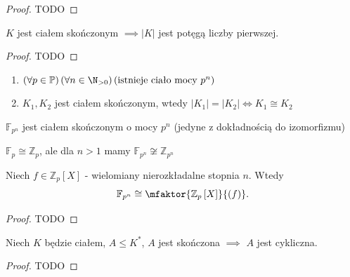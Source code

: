 \begin{proof}
	TODO
\end{proof} 
\begin{theorem}
	$K$ jest ciałem skończonym $\implies \left| K \right| $ jest potęgą liczby pierwszej.
\end{theorem} 
\begin{proof}
	TODO
\end{proof} 
\begin{theorem}
	\begin{enumerate}[label=\arabic*)]
		\item $\left(\forall p \in \mathbb{P}  \right)\left(\forall n \in \N_{>0} \right)\left( \text{istnieje ciało mocy } p^{n} \right)   $ 
		\item $K_1, K_2$ jest ciałem skończonym, wtedy $\left| K_1 \right| = \left| K_2 \right| \iff K_1\cong K_2$
	\end{enumerate}
	$\mathbb{F} _{p^{n}}$ jest ciałem skończonym o mocy $p^{n}$ (jedyne z dokładnością do izomorfizmu)
\end{theorem} 
\begin{remark}
	$\mathbb{F} _{p} \cong \mathbb{Z} _{p}$, ale dla $n>1$ mamy $\mathbb{F}_{p^{n}} \not\cong \mathbb{Z} _{p^{n}} $
\end{remark} 
\begin{eg}
	Niech $f\in \mathbb{Z} _{p}\left[ X \right] $ - wielomiany nierozkładalne stopnia $n$. Wtedy
	\[
	\mathbb{F} _{p^{n}} \cong  \mfaktor{\mathbb{Z} _{p}\left[ X \right] }{\left( f \right) } 
	.\] 
\end{eg} 
\begin{proof}
	TODO
\end{proof} 
\begin{theorem}
	Niech $K$ będzie ciałem, $A\le K^{\ast} $, $A$ jest skończona $\implies$ $A$ jest cykliczna.
\end{theorem} 
\begin{proof}
	TODO
\end{proof} 
